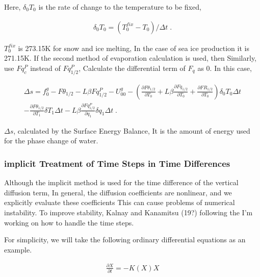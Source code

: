 \begin{quote}
\protect\hypertarget{combin-eq3}{}{\brain[combin-eq3]}
\end{quote}

Here, \(\delta_0 T_0\) is the rate of change to the temperature to be
fixed,

\begin{eqnarray}
   \delta_0 T_0 = ( T_0^{fix} - T_0 ) / \Delta t \; .
\end{eqnarray}

\(T_0^{fix}\) is 273.15K for snow and ice melting, In the case of sea
ice production it is 271.15K. If the second method of evaporation
calculation is used, then Similarly, use \(Fq^P_c\) instead of
\(Fq^P_{1/2}\), Calculate the differential term of \(F_q\) as 0. In this
case,

\begin{eqnarray}
\Delta s  =  f_0^g - F\theta_{1/2} - L \beta Fq^P_{1/2} - U_{00}^g
          -  \left(\frac{\partial F\theta_{1/2}}{\partial T_0}
                + L \beta \frac{\partial Fq_{1/2}}{\partial T_0}
                + \frac{\partial FR_{1/2}}{\partial T_0} \right) \delta_0 T_0 \Delta t 
                 \\
          -  \frac{\partial F\theta_{1/2}}{\partial T_1} \delta T_1 \Delta t
                - L \beta \frac{\partial Fq^P_{1/2}}{\partial q_1} \delta q_1 \Delta t \; .
\end{eqnarray}

\(\Delta s\), calculated by the Surface Energy Balance, It is the amount
of energy used for the phase change of water.

\hypertarget{implicit-treatment-of-time-steps-in-time-differences}{%
\subsubsection{implicit Treatment of Time Steps in Time
Differences}\label{implicit-treatment-of-time-steps-in-time-differences}}

Although the implicit method is used for the time difference of the
vertical diffusion term, In general, the diffusion coefficients are
nonlinear, and we explicitly evaluate these coefficients This can cause
problems of numerical instability. To improve stability, Kalnay and
Kanamitsu (19?) following the I'm working on how to handle the time
steps.

For simplicity, we will take the following ordinary differential
equations as an example.

\begin{eqnarray}
  \frac{\partial X}{\partial t} = - K(X) X
\end{eqnarray}

